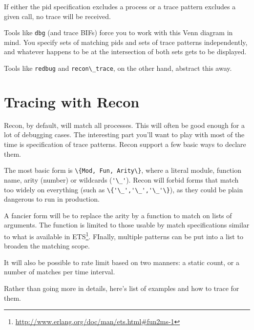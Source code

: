 \documentclass[11pt, oneside]{book}   	%
\newcommand{\otpapp}[1]{\Verb`#1`}
\newcommand{\module}[1]{\Verb`#1`}
\newcommand{\expression}[1]{\Verb`#1`}
\begin{document}
If either the pid specification excludes a process or a trace pattern excludes a given call, no trace will be received.

Tools like \otpapp{dbg} (and trace BIFs) force you to work with this Venn diagram in mind. You specify sets of matching pids and sets of trace patterns independently, and whatever happens to be at the intersection of both sets gets to be displayed.

Tools like \otpapp{redbug} and \module{recon\_trace}, on the other hand, abstract this away.
\FloatBarrier

\section{Tracing with Recon}

Recon, by default, will match all processes. This will often be good enough for a lot of debugging cases. The interesting part you'll want to play with most of the time is specification of trace patterns. Recon support a few basic ways to declare them. 

The most basic form is \expression{\{Mod, Fun, Arity\}}, where a literal module, function name, arity (number) or wildcards (\expression{'\_'}). Recon will forbid forms that match too widely on everything (such as \expression{\{'\_','\_','\_'\}}), as they could be plain dangerous to run in production.

A fancier form will be to replace the arity by a function to match on lists of arguments. The function is limited to those usable by match specifications similar to what is available in ETS\footnote{\href{http://www.erlang.org/doc/man/ets.html\#fun2ms-1}{http://www.erlang.org/doc/man/ets.html\#fun2ms-1}}. FInally, multiple patterns can be put into a list to broaden the matching scope.

It will also be possible to rate limit based on two manners: a static count, or a number of matches per time interval.

Rather than going more in details, here's list of examples and how to trace for them.
\end{document}
